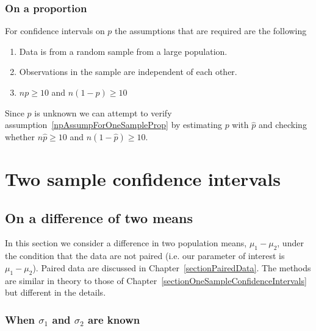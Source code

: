 \subsubsection{On a proportion}
\label{sectionAssumpOnProp}

For confidence intervals on $p$ the assumptions that are required are the following

\begin{enumerate}
\item	Data is from a random sample from a large population.
\item	Observations in the sample are independent of each other.
\item	$np \geq 10$ and $n(1-p) \geq 10$ \label{npAssumpForOneSampleProp}
\end{enumerate}

Since $p$ is unknown we can attempt to verify assumption~\ref{npAssumpForOneSampleProp} by 
estimating $p$ with $\hat{p}$ and checking whether $n\hat{p} \geq 10$ and $n(1-\hat{p}) \geq 10$. 


\section{Two sample confidence intervals}
\label{sectionTwoSampleConfidenceIntervals}

\subsection{On a difference of two means}
\label{differenceOfTwoMeans}


In this section we consider a difference in two population means, $\mu_1 - \mu_2$, under the condition that the data are not paired
(i.e. our parameter of interest is $\mu_1 - \mu_2$).
Paired data are discussed in Chapter~\ref{sectionPairedData}.
The methods are similar in theory to those of Chapter~\ref{sectionOneSampleConfidenceIntervals}
but different in the details.


\subsubsection{When $\sigma_{1}$ and $\sigma_{2}$ are known}

